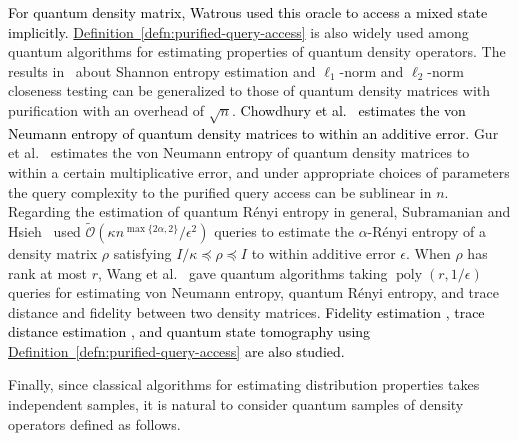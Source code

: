 \documentclass[journal]{IEEEtran}
\newcommand{\defn}[1]{\hyperref[defn:#1]{Definition~\ref*{defn:#1}}}
\DeclareMathOperator{\poly}{poly}
\newcommand{\xzw}[1]{{\color{blue}{Xinzhao: \textbf{#1}}}}
\begin{document}
\textcolor{black}{For quantum density matrix, Watrous \cite{watrous2002limits} used this oracle to access a mixed state implicitly. }\defn{purified-query-access} is also widely used among quantum algorithms for estimating properties of quantum density operators. The results in~\cite{gilyen2019distributional} about Shannon entropy estimation and $\ell_{1}$-norm and $\ell_{2}$-norm closeness testing  can be generalized to those of quantum density matrices with purification with an overhead of $\sqrt{n}$. \textcolor{black}{Chowdhury et al.~\cite{chowdhury2020variational} estimates the von Neumann entropy of quantum density matrices to within an additive error}. Gur et al.~\cite{gur2021sublinear} estimates the von Neumann entropy of quantum density matrices to within a certain multiplicative error, and under appropriate choices of parameters the query complexity to the purified query access can be sublinear in $n$. Regarding the estimation of quantum R{\'e}nyi entropy in general, Subramanian and Hsieh~\cite{subramanian2021quantum} used $\widetilde{\mathcal{O}}(\kappa n^{\max\{2\alpha,2\}}/\epsilon^{2})$ queries to estimate the $\alpha$-R{\'e}nyi entropy of a density matrix $\rho$ satisfying $I/\kappa\preceq\rho\preceq I$ to within additive error $\epsilon$. When $\rho$ has rank at most $r$, Wang et al.~\cite{wang2022new} gave quantum algorithms taking $\poly(r,1/\epsilon)$ queries for estimating von Neumann entropy, quantum R{\'e}nyi entropy, and trace distance and fidelity between two density matrices. \textcolor{black}{Fidelity estimation \cite{wang2022fidelity,gilyen2022improved}, trace distance estimation \cite{wang2023fast}, and quantum state tomography \cite{van2023quantum} using \defn{purified-query-access} are also studied.}

Finally, since classical algorithms for estimating distribution properties takes independent samples, it is natural to consider quantum samples of density operators defined as follows.



\end{document}

